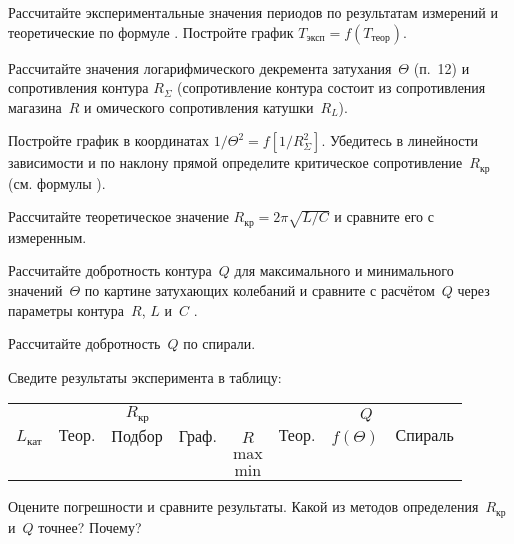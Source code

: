 \begin{lab:task}

	\item Рассчитайте экспериментальные значения периодов по результатам
измерений и теоретические по формуле . 
Постройте график $T_\text{эксп} = f(T_\text{теор})$.

	\item Рассчитайте значения логарифмического декремента затухания~$\Theta$ 
    (п.~12) и сопротивления контура $R_{\Sigma}$ (сопротивление контура состоит 
    из сопротивления магазина~$R$ и омического сопротивления катушки~$R_L$).

Постройте график в координатах $1/\Theta^2 =f[1/R^2_{\Sigma}]$. Убедитесь 
в линейности зависимости и по наклону прямой определите критическое 
сопротивление~$R_\text{кр}$ (см. формулы ). 

	\item Рассчитайте теоретическое значение $R_\text{кр} = 2\pi\sqrt{L / C}$
и сравните его с измеренным.

	\item Рассчитайте добротность контура~$Q$ для максимального и минимального
значений~$\Theta$ по картине затухающих колебаний и сравните с расчётом~$Q$
через параметры контура~$R$, $L$ и~$C$  .

	\item Рассчитайте добротность~$Q$ по спирали.

	\item Сведите результаты эксперимента в таблицу:

\begin{center}\small
\begin{tabular}{|c|c|c|c|c|c|c|c|}
\hline
& \multicolumn{3}{c|}{$R_{\text{кр}}$} &  & \multicolumn{3}{c|}{$Q$} \\
\cline{2-4}
\cline{6-8}
$L_{\text{кат}}$ & $\text{Теор.}$ & $\text{Подбор}$ & $\text{Граф.}$ & $R$ &
$\text{Теор.}$ & $f(\Theta)$ & $\text{Спираль}$  \\
\hline
& & & & $\text{max}$ & & &  \\
& & & & $\text{min}$ & & &  \\
\hline
\end{tabular}
\end{center}

	\item Оцените погрешности и сравните результаты. Какой из методов
определения~$R_\text{кр}$ и~$Q$ точнее? Почему?

\end{lab:task}


